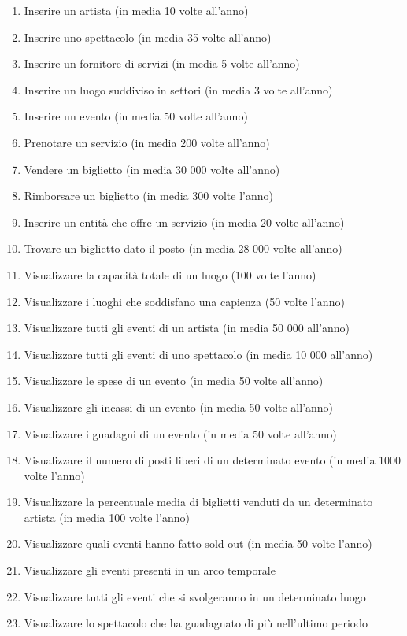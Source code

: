 \documentclass[a4paper,11pt]{article}
\begin{document}
\begin{enumerate}
    \item Inserire un artista (in media 10 volte all'anno)
    \item Inserire uno spettacolo (in media 35 volte all'anno)
    \item Inserire un fornitore di servizi (in media 5 volte all'anno)
    \item Inserire un luogo suddiviso in settori (in media 3 volte all'anno)
    \item Inserire un evento (in media 50 volte all'anno)
    \item Prenotare un servizio (in media 200 volte all'anno)
    \item Vendere un biglietto (in media 30 000 volte all'anno)
    \item Rimborsare un biglietto (in media 300 volte l'anno)
    \item Inserire un entità che offre un servizio (in media 20 volte all'anno)
    \item Trovare un biglietto dato il posto (in media 28 000 volte all'anno)
    \item Visualizzare la capacità totale di un luogo (100 volte l'anno)
    \item Visualizzare i luoghi che soddisfano una capienza (50 volte l'anno)
    \item Visualizzare tutti gli eventi di un artista (in media 50 000 all'anno)
    \item Visualizzare tutti gli eventi di uno spettacolo (in media 10 000 all'anno)
    \item Visualizzare le spese di un evento (in media 50 volte all'anno)
    \item Visualizzare gli incassi di un evento (in media 50 volte all'anno)
    \item Visualizzare i guadagni di un evento (in media 50 volte all'anno)
    \item Visualizzare il numero di posti liberi di un determinato evento (in media 1000 volte l'anno)
    \item Visualizzare la percentuale media di biglietti venduti da un determinato artista (in media 100 volte l'anno)
    \item Visualizzare quali eventi hanno fatto sold out (in media 50 volte l'anno)
    \item Visualizzare gli eventi presenti in un arco temporale
    \item Visualizzare tutti gli eventi che si svolgeranno in un determinato luogo
    \item Visualizzare lo spettacolo che ha guadagnato di più nell'ultimo periodo
\end{enumerate}
\end{document}
